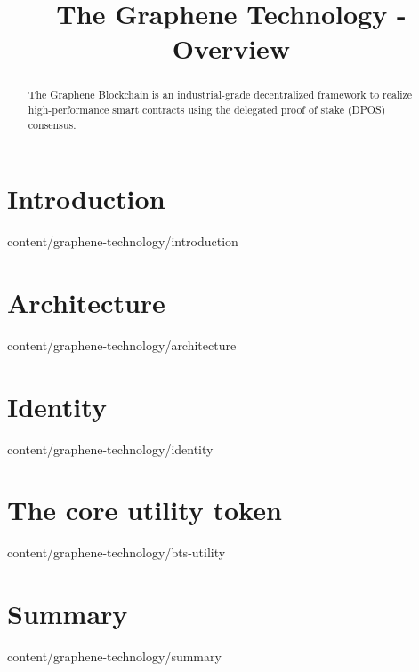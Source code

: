 \documentclass{btswhitepaper}
\title{The Graphene Technology - Overview}
\begin{document}
\maketitle

\begin{abstract}%
 The Graphene Blockchain is an industrial-grade decentralized framework to realize 
high-performance smart contracts using the delegated proof of stake (DPOS) consensus.
\end{abstract}

\section { Introduction            }  { content/graphene-technology/introduction } 

\section { Architecture            }  { content/graphene-technology/architecture } 

\section { Identity                }  { content/graphene-technology/identity     } 

\section { The core utility token }  { content/graphene-technology/bts-utility  } 

\section { Summary }  { content/graphene-technology/summary  } 



\end{document}

